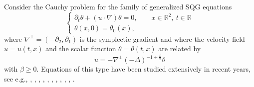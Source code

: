 \documentclass[11pt]{amsart}
\numberwithin{equation}{section}
\begin{document}
Consider the Cauchy problem for the family of 
generalized SQG equations 
% 
\begin{equation} \label{eq:gSQG} 
\begin{cases} 
\partial_t \theta+(u\cdot\nabla)\theta = 0, 
\qquad 
x\in \mathbb{R}^2,\ t\in \mathbb{R} 
\\ 
\theta(x,0)=\theta_{0} (x), 
\end{cases} 
\end{equation} 
% 
where $\nabla^{\perp}=(-\partial_2, \partial_1)$ 
is the symplectic gradient and where the velocity field 
$u=u(t,x)$ 
and the scalar function 
$\theta=\theta(t,x)$ 
are related by 
% 
\begin{equation*} \label{vel} 
u=-\nabla^{\perp}(-\Delta)^{-1+\frac{\beta}{2}}\theta 
\end{equation*} 
% 
with $\beta \ge 0$. 
Equations of this type have been studied extensively in recent years, see e.g., \cite{bauer2024geometric}, \cite{castro2025unstable}, \cite{CCCGW12},
\cite{CJK25},
\cite{constantin2016contrast},  \cite{CMT94}, \cite{inci2015regularity}, \cite{jolly2021sqg}, \cite{MV2023}, \cite{Wash},  \cite{YZJ}.
\end{document}
